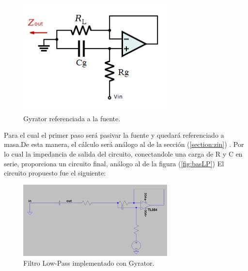 \documentclass[a4paper]{article}
\begin{document}
\begin{figure}[H]	
	\centering
	\includegraphics[width=0.7\textwidth]{ImagenesEj2/gyrfloat.png}
	\caption{Gyrator referenciada a la fuente.}
	\label{fig:gyrfloat}
\end{figure}
Para el cual el primer paso será pasivar la fuente y quedará referenciado a masa.De esta manera, el cálculo será análogo al de la sección (\ref{section:zin}) . Por lo cual la impedancia de salida del circuito, conectandole una carga de R y C en serie, proporciona un circuito final, análogo al de la figura (\ref{fig:basLP})
El circuito propuesto fue el siguiente:
\begin{figure}[H]	
	\centering
	\includegraphics[width=0.7\textwidth]{ImagenesEj2/gyrLP.PNG}
	\caption{Filtro Low-Pass implementado con Gyrator.}
	\label{fig:gyrLP}
\end{figure}
\end{document}
